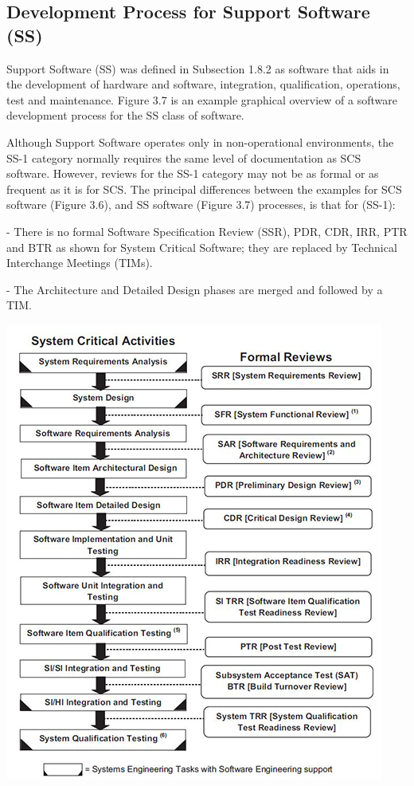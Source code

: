 \documentclass{book}
\begin{document}
\subsection{Development Process for Support Software (SS)}

Support Software (SS) was defined in Subsection 1.8.2 as software
that aids in the development of hardware and software,
integration, qualification, operations, test and maintenance.
Figure 3.7 is an example graphical overview of a software
development process for the SS class of software.

Although Support Software operates only in non-operational
environments, the SS-1 category normally requires
the same level of documentation as SCS software. However,
reviews for the SS-1 category may not be as formal or as frequent
as it is for SCS. The principal differences between the
examples for SCS software (Figure 3.6), and SS software
(Figure 3.7) processes, is that for (SS-1):

- There is no formal Software Specification Review
(SSR), PDR, CDR, IRR, PTR and BTR as shown
for System Critical Software; they are replaced by
Technical Interchange Meetings (TIMs).

- The Architecture and Detailed Design phases are
merged and followed by a TIM.

\includegraphics{4.jpg}
\end{document}
